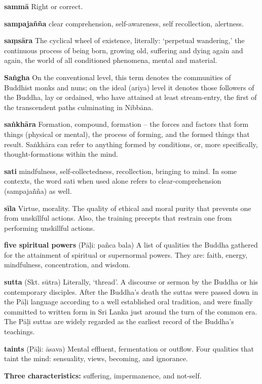 \textbf{sammā} Right or correct.

\textbf{sampajañña} clear comprehension, self-awareness, self 
recollection, alertness.

\textbf{saṃsāra} The cyclical wheel of existence, literally: 
`perpetual wandering,' the continuous process of being born, growing 
old, suffering and dying again and again, the world of all conditioned 
phenomena, mental and material.

\textbf{Saṅgha} On the conventional level, this term denotes the 
communities of Buddhist monks and nuns; on the ideal (ariya) level it 
denotes those followers of the Buddha, lay or ordained, who have 
attained at least stream-entry, the first of the transcendent paths 
culminating in Nibbāna.

\textbf{saṅkhāra} Formation, compound, formation – the forces and 
factors that form things (physical or mental), the process of forming, 
and the formed things that result. Saṅkhāra can refer to anything 
formed by conditions, or, more specifically, thought-formations within 
the mind.

\textbf{sati} mindfulness, self-collectedness, recollection, bringing 
to mind. In some contexts, the word sati when used alone refers to 
clear-comprehension (sampajañña) as well.

\textbf{sīla} Virtue, morality. The quality of ethical and moral 
purity that prevents one from unskillful actions. Also, the training 
precepts that restrain one from performing unskillful actions.

\textbf{five spiritual powers} (Pāḷi: pañca bala) A list of 
qualities the Buddha gathered for the attainment of spiritual or 
supernormal powers. They are: faith, energy, mindfulness, 
concentration, and wisdom.

\textbf{sutta} (Skt. sūtra) Literally, `thread'. A discourse or sermon 
by the Buddha or his contemporary disciples. After the Buddha's death 
the suttas were passed down in the Pāḷi language according to a well 
established oral tradition, and were finally committed to written form 
in Sri Lanka just around the turn of the common era. The Pāḷi suttas 
are widely regarded as the earliest record of the Buddha's teachings.

\textbf{taints} (Pāḷi: āsava) Mental effluent, fermentation or 
outflow. Four qualities that taint the mind: sensuality, views, 
becoming, and ignorance.

\textbf{Three characteristics:} suffering, impermanence, and not-self.

